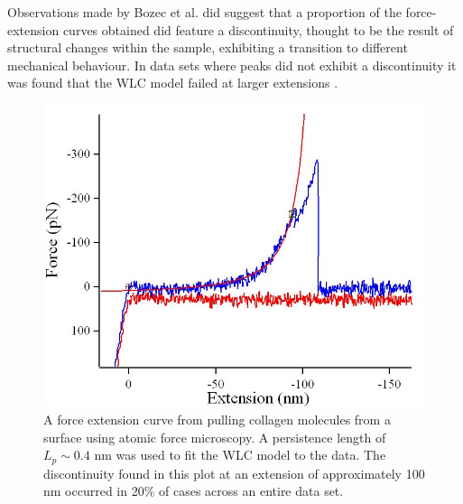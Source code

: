 Observations made by Bozec et al. did suggest that a proportion of the force-extension curves obtained did feature a discontinuity, thought to be the result of structural changes within the sample, exhibiting a transition to different mechanical behaviour. In data sets where peaks did not exhibit a discontinuity it was found that the WLC model failed at larger extensions \cite{Bozec2005a}. 

\begin{figure}[H]
\centering
\includegraphics[scale=0.25]{Graphics/Collagen/Bozec_2005.jpg}
\caption{A force extension curve from pulling collagen molecules from a surface using atomic force microscopy. A persistence length of $L_{p} \sim 0.4 \text{ nm}$ was used to fit the WLC model to the data. The discontinuity found in this plot at an extension of approximately 100 nm occurred in 20\% of cases across an entire data set.} 
\label{fig:bozec_tc_entropic_response}
\end{figure}

